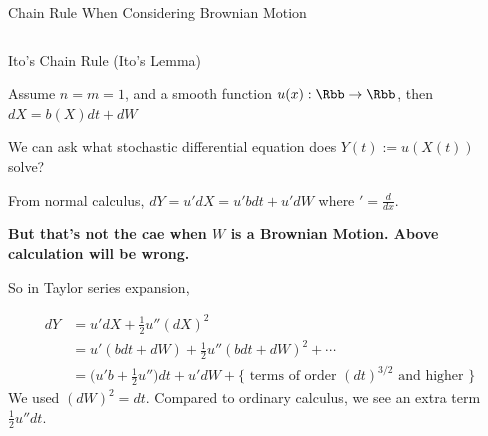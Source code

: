 \documentclass[aspectratio=169,xcolor=dvipsnames,svgnames,x11names,fleqn]{beamer}
\begin{document}
\begin{frame}{Chain Rule When Considering Brownian Motion}
\begin{columns}
{
        }

    \end{columns}
    
\end{frame}


\begin{frame}{Ito's Chain Rule (Ito's Lemma)}

    \footnotesize

    Assume $n = m  = 1$, and a smooth function $u(x): \Rbb \to \Rbb$, then $dX = b(X) dt + dW$

    \vspace{5pt}
    
    We can ask what stochastic differential equation does $Y(t) := u(X(t))$ solve?
    
    \vspace{3pt}

    From normal calculus, $dY = u'dX = u'bdt + u'dW$ where $' = \frac{d}{dx}$.

    
    \vspace{10pt}

    \textbf{But that's not the cae when $W$ is a Brownian Motion. Above calculation will be wrong.}

    So in Taylor series expansion, 

    \begin{align*}
        dY & = u'dX + \frac{1}{2}u'' (dX)^2\\
            & = u'(bdt + dW) + \frac{1}{2}u''(bdt + dW)^2 + \cdots\\
            & = \bigg ( u'b  + \frac{1}{2}u''\bigg) dt + u'dW + \{ \text{ terms of order } (dt)^{3/2} \text{ and higher } \}
    \end{align*}
    We used $(dW)^2 = dt$. Compared to ordinary calculus, we see an extra term $\frac{1}{2}u''dt$.


    
\end{frame}
\end{document}
